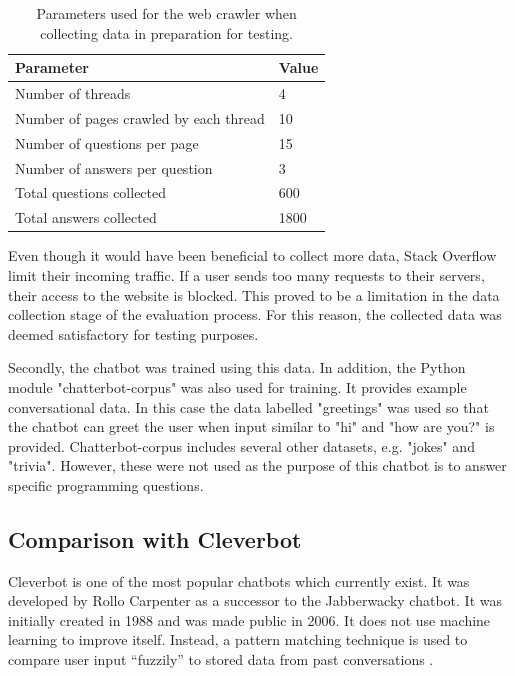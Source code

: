 \documentclass[12pt,a4paper]{article}
\newcommand{\captionstyle}[1] {
    \small{#1}
}
\begin{document}
\begin{table}[!htb]
    \centering
    \renewcommand\arraystretch{1.6}
    \caption{\captionstyle{Parameters used for the web crawler when collecting data in preparation for testing.}}
    \label{tbl:crawlerparams}
    \begin{tabularx}{\textwidth}{XY}
        \toprule
        \textbf{Parameter} & \textbf{Value}  \\
        \midrule
        Number of threads & 4 \\
        Number of pages crawled by each thread & 10 \\
        Number of questions per page & 15\\
        Number of answers per question & 3 \\
        \hline
        Total questions collected & 600 \\
        Total answers collected & 1800 \\
        \bottomrule
    \end{tabularx}
\end{table}%

Even though it would have been beneficial to collect more data, Stack Overflow limit their incoming traffic. If a user sends too many requests to their servers, their access to the website is blocked. This proved to be a limitation in the data collection stage of the evaluation process. For this reason, the collected data was deemed satisfactory for testing purposes.

Secondly, the chatbot was trained using this data. In addition, the Python module "chatterbot-corpus" was also used for training. It provides example conversational data. In this case the data labelled "greetings" was used so that the chatbot can greet the user when input similar to "hi" and "how are you?" is provided. Chatterbot-corpus includes several other datasets, e.g. "jokes" and "trivia". However, these were not used as the purpose of this chatbot is to answer specific programming questions.

\subsection{Comparison with Cleverbot}
Cleverbot \citep{Cleverbot:online} is one of the most popular chatbots which currently exist. It was developed by Rollo Carpenter as a successor to the Jabberwacky chatbot. It was initially created in 1988 and was made public in 2006. It does not use machine learning to improve itself. Instead, a pattern matching technique is used to compare user input “fuzzily” to stored data from past conversations \citep{Cleverbot:online}. 
\end{document}
